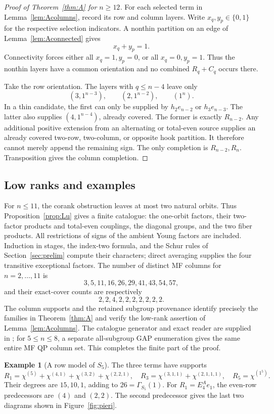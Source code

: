 \documentclass[11pt]{article}
\numberwithin{equation}{section}
\theoremstyle{definition}
\newtheorem{example}[theorem]{Example}
\begin{document}
\begin{proof}[Proof of Theorem~\ref{thm:A} for \(n\geq12\)]
For each selected term in Lemma~\ref{lem:Acolumns}, record its row and column layers.
Write \(x_q,y_p\in\{0,1\}\) for the respective selection indicators.
A nonthin partition on an edge of Lemma~\ref{lem:Aconnected} gives
\[
 x_q+y_p=1.
\]
Connectivity forces either all \(x_q=1,y_p=0\), or all \(x_q=0,y_p=1\).
Thus the nonthin layers have a common orientation and no combined \(R_q+C_q\) occurs there.

Take the row orientation.
The layers with \(q\leq n-4\) leave only
\[
 (3,1^{n-3}),\qquad(2,1^{n-2}),\qquad(1^n).
\]
In a thin candidate, the first can only be supplied by \(h_2e_{n-2}\) or \(h_3e_{n-3}\).
The latter also supplies \((4,1^{n-4})\), already covered.
The former is exactly \(R_{n-2}\).
Any additional positive extension from an alternating or total-even source supplies an already covered two-row, two-column, or opposite hook partition.
It therefore cannot merely append the remaining sign.
The only completion is \(R_{n-2},R_n\).
Transposition gives the column completion.
\end{proof}

\subsection{Low ranks and examples}

For \(n\leq11\), the corank obstruction leaves at most two natural orbits.
Thus Proposition~\ref{prop:Lu} gives a finite catalogue: the one-orbit factors, their two-factor products and total-even couplings, the diagonal groups, and the two fiber products.
All restrictions of signs of the ambient Young factors are included.
Induction in stages, the index-two formula, and the Schur rules of Section~\ref{sec:prelim} compute their characters; direct averaging supplies the four transitive exceptional factors.
The number of distinct MF columns for \(n=2,\ldots,11\) is
\[
 3,5,11,16,26,29,41,43,54,57,
\]
and their exact-cover counts are respectively
\[
 2,2,4,2,2,2,2,2,2,2.
\]
The column supports and the retained subgroup provenance identify precisely the families in Theorem~\ref{thm:A} and verify the low-rank assertion of Lemma~\ref{lem:Acolumns}.
The catalogue generator and exact reader are supplied in \cite{ZhangData}; for \(5\leq n\leq8\), a separate all-subgroup GAP enumeration gives the same entire MF QP column set.
This completes the finite part of the proof.

\begin{example}[A row model of \(S_5\)]
The three terms have supports
\[
 R_1=\chi^{(5)}+\chi^{(4,1)}+\chi^{(3,2)}+\chi^{(2,2,1)},\quad
 R_3=\chi^{(3,1,1)}+\chi^{(2,1,1,1)},\quad
 R_5=\chi^{(1^5)}.
\]
Their degrees are \(15,10,1\), adding to \(26=\Gamma_{S_5}(1)\).
For \(R_1=E^A_4e_1\), the even-row predecessors are \((4)\) and \((2,2)\).
The second predecessor gives the last two diagrams shown in Figure~\ref{fig:pieri}.
\end{example}
\end{document}
